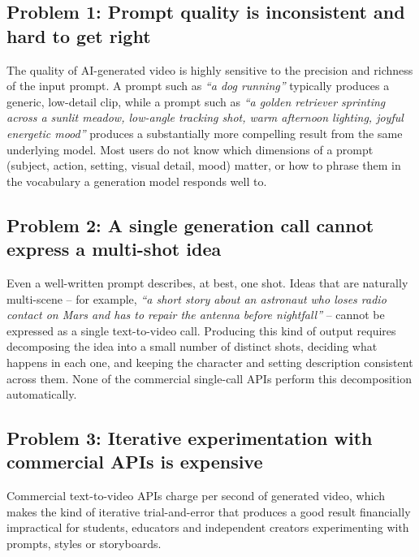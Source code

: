 \documentclass[11pt,a4paper]{article}
\begin{document}
\subsection*{Problem 1: Prompt quality is inconsistent and hard to get right}
The quality of AI-generated video is highly sensitive to the precision and richness of the input prompt. A prompt such as \textit{``a dog running''} typically produces a generic, low-detail clip, while a prompt such as \textit{``a golden retriever sprinting across a sunlit meadow, low-angle tracking shot, warm afternoon lighting, joyful energetic mood''} produces a substantially more compelling result from the same underlying model. Most users do not know which dimensions of a prompt (subject, action, setting, visual detail, mood) matter, or how to phrase them in the vocabulary a generation model responds well to.

\subsection*{Problem 2: A single generation call cannot express a multi-shot idea}
Even a well-written prompt describes, at best, one shot. Ideas that are naturally multi-scene -- for example, \textit{``a short story about an astronaut who loses radio contact on Mars and has to repair the antenna before nightfall''} -- cannot be expressed as a single text-to-video call. Producing this kind of output requires decomposing the idea into a small number of distinct shots, deciding what happens in each one, and keeping the character and setting description consistent across them. None of the commercial single-call APIs perform this decomposition automatically.

\subsection*{Problem 3: Iterative experimentation with commercial APIs is expensive}
Commercial text-to-video APIs charge per second of generated video, which makes the kind of iterative trial-and-error that produces a good result financially impractical for students, educators and independent creators experimenting with prompts, styles or storyboards.
\end{document}
